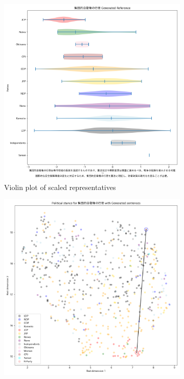 \documentclass[final,5p,times,twocolumn,authoryear]{elsarticle}
\begin{document}
\begin{figure}[h]
\centering
    \begin{subfigure}{0.22\textwidth}
      \centering
      \includegraphics[width=1\linewidth]{figs/results/defence/collectiveselfdefence_gen_violin_plot.png}
      \caption{Violin plot of scaled representatives}
    \end{subfigure}
    \begin{subfigure}{0.22\textwidth}
      \centering
      \includegraphics[width=1\linewidth]{figs/results/defence/collectiveselfdefence_umap_gen.png}

\end{subfigure}
\end{figure}
\end{document}
